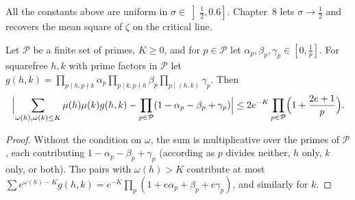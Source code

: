All the constants above are uniform in $\sigma\in\left]\frac12,0.6\right]$. Chapter~8 lets $\sigma\to\frac12$ and recovers the mean square of $\zeta$ on the critical line.

\begin{lemma}\label{lem:rankinquad}
Let $\mathcal P$ be a finite set of primes, $K\ge0$, and for $p\in\mathcal P$ let $\alpha_p,\beta_p,\gamma_p\in[0,\frac1p]$. For squarefree $h,k$ with prime factors in $\mathcal P$ let $g(h,k)=\prod_{p\mid h,p\nmid k}\alpha_p\prod_{p\mid k,p\nmid h}\beta_p\prod_{p\mid(h,k)}\gamma_p$. Then
\[
\Bigl|\sum_{\omega(h),\omega(k)\le K}\mu(h)\mu(k)g(h,k)-\prod_{p\in\mathcal P}(1-\alpha_p-\beta_p+\gamma_p)\Bigr|\le2e^{-K}\prod_{p\in\mathcal P}\Bigl(1+\frac{2e+1}p\Bigr).
\]
\end{lemma}
\begin{proof}
Without the condition on $\omega$, the sum is multiplicative over the primes of $\mathcal P$, each contributing $1-\alpha_p-\beta_p+\gamma_p$ (according as $p$ divides neither, $h$ only, $k$ only, or both). The pairs with $\omega(h)>K$ contribute at most $\sum e^{\omega(h)-K}g(h,k)=e^{-K}\prod_p(1+e\alpha_p+\beta_p+e\gamma_p)$, and similarly for $k$.
\end{proof}

